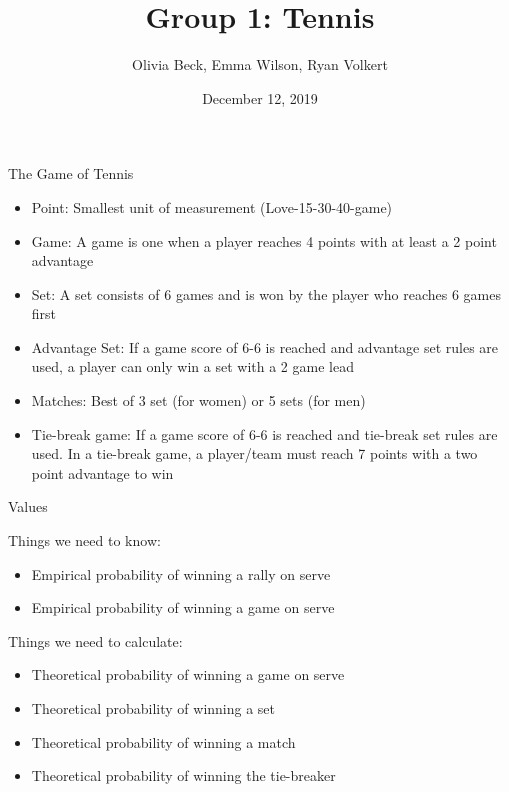 \documentclass[ignorenonframetext,]{beamer}
\title{Group 1: Tennis}
\author{Olivia Beck, Emma Wilson, Ryan Volkert}
\date{December 12, 2019}
\begin{document}
\frame{\titlepage}

\begin{frame}{The Game of Tennis}

\begin{itemize}
\item
  Point: Smallest unit of measurement (Love-15-30-40-game)
\item
  Game: A game is one when a player reaches 4 points with at least a 2
  point advantage
\item
  Set: A set consists of 6 games and is won by the player who reaches 6
  games first
\item
  Advantage Set: If a game score of 6-6 is reached and advantage set
  rules are used, a player can only win a set with a 2 game lead
\item
  Matches: Best of 3 set (for women) or 5 sets (for men)
\item
  Tie-break game: If a game score of 6-6 is reached and tie-break set
  rules are used. In a tie-break game, a player/team must reach 7 points
  with a two point advantage to win
\end{itemize}

\end{frame}

\begin{frame}{Values}

Things we need to know:

\begin{itemize}
\item
  Empirical probability of winning a rally on serve
\item
  Empirical probability of winning a game on serve \pause
\end{itemize}

Things we need to calculate:

\begin{itemize}
\item
  Theoretical probability of winning a game on serve
\item
  Theoretical probability of winning a set
\item
  Theoretical probability of winning a match
\item
  Theoretical probability of winning the tie-breaker
\end{itemize}

\end{frame}
\end{document}
